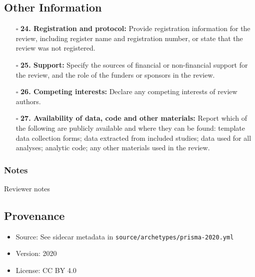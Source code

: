 \documentclass[11pt]{article}
\def\tightlist{}
\begin{document}
\begin{Form}
\subsection{Other Information}\label{other-information}

\begin{itemize}
\tightlist
\item[$\square$]
  \textbf{24. Registration and protocol:} Provide registration
  information for the review, including register name and registration
  number, or state that the review was not registered.
\item[$\square$]
  \textbf{25. Support:} Specify the sources of financial or
  non-financial support for the review, and the role of the funders or
  sponsors in the review.
\item[$\square$]
  \textbf{26. Competing interests:} Declare any competing interests of
  review authors.
\item[$\square$]
  \textbf{27. Availability of data, code and other materials:} Report
  which of the following are publicly available and where they can be
  found: template data collection forms; data extracted from included
  studies; data used for all analyses; analytic code; any other
  materials used in the review.
\end{itemize}

\subsubsection{Notes}\label{notes}

{Reviewer notes}

\subsection{Provenance}\label{provenance}

\begin{itemize}
\tightlist
\item
  Source: See sidecar metadata in
  \texttt{source/archetypes/prisma-2020.yml}
\item
  Version: 2020
\item
  License: CC BY 4.0
\end{itemize}

\end{Form}
\end{document}

